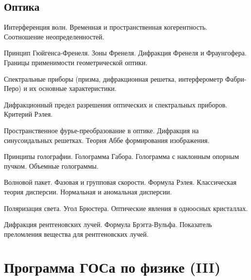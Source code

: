 \subsection*{Оптика}
\begin{enumerate*}
\setcounter{enumi}{34}
\item Интерференция волн. Временная и пространственная когерентность. Соотношение неопределенностей.
\item Принцип Гюйгенса-Френеля. Зоны Френеля. Дифракция Френеля и Фраунгофера. Границы применимости геометрической оптики.
\item Спектральные приборы (призма, дифракционная решетка, интерферометр Фабри-Перо) и их основные характеристики.
\item Дифракционный предел разрешения оптических и спектральных приборов. Критерий Рэлея.
\item Пространственное фурье-преобразование в оптике. Дифракция на синусоидальных решетках. Теория Аббе формирования изображения.
\item Принципы голографии. Голограмма Габора. Голограмма с наклонным опорным пучком. Объемные
голограммы.
\item Волновой пакет. Фазовая и групповая скорости. Формула Рэлея. Классическая теория дисперсии.
Нормальная и аномальная дисперсии.
\item Поляризация света. Угол Брюстера. Оптические явления в одноосных кристаллах.
\item Дифракция рентгеновских лучей. Формула Брэгга-Вульфа. Показатель преломления вещества для
рентгеновских лучей.
\end{enumerate*}

\newpage

\section*{Программа ГОСа по физике (III)}

